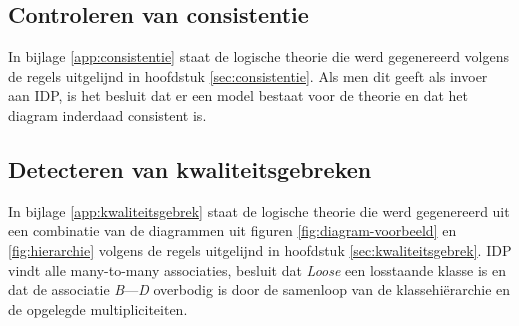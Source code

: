 \subsection{Controleren van consistentie}
In bijlage \ref{app:consistentie} staat de logische theorie die werd gegenereerd volgens de regels uitgelijnd in hoofdstuk \ref{sec:consistentie}. Als men dit geeft als invoer aan IDP, is het besluit dat er een model bestaat voor de theorie en dat het diagram inderdaad consistent is.

\subsection{Detecteren van kwaliteitsgebreken}
In bijlage \ref{app:kwaliteitsgebrek} staat de logische theorie die werd gegenereerd uit een combinatie van de diagrammen uit figuren \ref{fig:diagram-voorbeeld} en \ref{fig:hierarchie} volgens de regels uitgelijnd in hoofdstuk \ref{sec:kwaliteitsgebrek}. IDP vindt alle many-to-many associaties, besluit dat \textit{Loose} een losstaande klasse is en dat de associatie \textit{B}---\textit{D} overbodig is door de samenloop van de klassehi\"erarchie en de opgelegde multipliciteiten.
